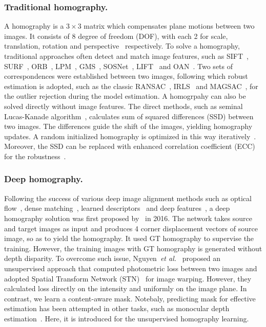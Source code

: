 \documentclass[runningheads]{llncs}
\begin{document}
\subsubsection{Traditional homography.}
A homography is a $3 \times 3$ matrix which compensates plane motions between two images. It consists of $8$ degree of freedom (DOF), with each 2 for scale, translation, rotation and perspective~\cite{hartley2003multiple} respectively. To solve a homography, traditional approaches often detect and match image features, {\color{black}such as SIFT~\cite{lowe2004distinctive}, SURF~\cite{bay2006surf}, ORB~\cite{rublee2011orb}, LPM~\cite{ma2019locality}, GMS~\cite{bian2017gms}, SOSNet~\cite{tian2019sosnet}, LIFT~\cite{yi2016lift} and OAN~\cite{zhang2019learning}.} Two sets of correspondences were established between two images, following which robust estimation is adopted, such as the classic RANSAC~\cite{fischler1981random}, IRLS~\cite{holland1977robust} and MAGSAC~\cite{barath2019magsac}, for the outlier rejection during the model estimation. A homogrpahy can also be solved directly without image features. The direct methods, such as seminal Lucas-Kanade algorithm~\cite{lucas1981iterative}, calculates sum of squared differences (SSD) between two images. The differences guide the shift of the images, yielding homography updates. A random initialized homography is optimized in this way iteratively~\cite{baker2004lucas}. Moreover, the SSD can be replaced with enhanced correlation coefficient (ECC) for the robustness~\cite{evangelidis2008parametric}.

\subsubsection{Deep homography.}
Following the success of various deep image alignment methods such as optical flow~\cite{weinzaepfel2013deepflow,ilg2017flownet}, dense matching~\cite{revaud2016deepmatching}, learned descriptors~\cite{tian2019sosnet} and deep features~\cite{altwaijry2016learning}, a deep homography solution was first proposed by~\cite{detone2016deep} in 2016. The network takes source and target images as input and produces 4 corner displacement vectors of source image, so as to yield the homography. It used GT homography to supervise the training. However, the training images with GT homography is generated without depth disparity. To overcome such issue, Nguyen~\emph{et al.}~\cite{nguyen2018unsupervised} proposed an unsupervised approach that computed photometric loss between two images and adopted Spatial Transform Network (STN)~\cite{jaderberg2015spatial} for image warping. {\color{black}However, they calculated loss directly on the intensity and uniformly on the image plane. In contrast, we learn a content-aware mask. Notebaly, predicting mask for effective estimation has been attempted in other tasks, such as monocular depth estimation~\cite{zhou2017unsupervised,godard2019digging}. Here, it is introduced for the unsupervised homography learning.}
\end{document}
